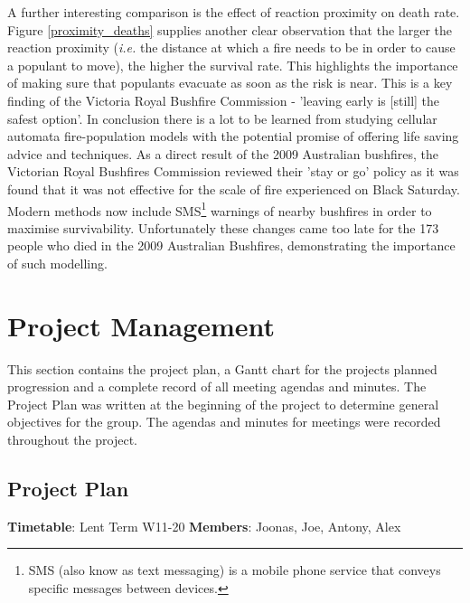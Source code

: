 A further interesting comparison is the effect of reaction proximity on death rate. Figure \ref{proximity_deaths} supplies another clear observation that the larger the reaction proximity (\textit{i.e.} the distance at which a fire needs to be in order to cause a populant to move), the higher the survival rate. This highlights the importance of making sure that populants evacuate as soon as the risk is near. This is a key finding of the Victoria Royal Bushfire Commission - 'leaving early is [still] the safest option'. \newpage \noindent In conclusion there is a lot to be learned from studying cellular automata fire-population models with the potential promise of offering life saving advice and techniques. As a direct result of the 2009 Australian bushfires, the Victorian Royal Bushfires Commission reviewed their 'stay or go' policy \cite{RoyalCommission} as it was found that it was not effective for the scale of fire experienced on Black Saturday. Modern methods now include SMS\footnote{SMS (also know as text messaging) is a mobile phone service that conveys specific messages between devices.} warnings of nearby bushfires in order to maximise survivability. Unfortunately these changes came too late for the 173 people who died in the 2009 Australian Bushfires, demonstrating the importance of such modelling.

\clearpage

\section{Project Management}\label{management}
This section contains the project plan, a Gantt chart for the projects planned progression and a complete record of all meeting agendas and minutes. The Project Plan was written at the beginning of the project to determine general objectives for the group. The agendas and minutes for meetings were recorded throughout the project.
\subsection{Project Plan}

\small

\hspace{\parindent}\textbf{Timetable}: Lent Term W11-20 \hspace{1cm} \textbf{Members}: Joonas, Joe, Antony, Alex


